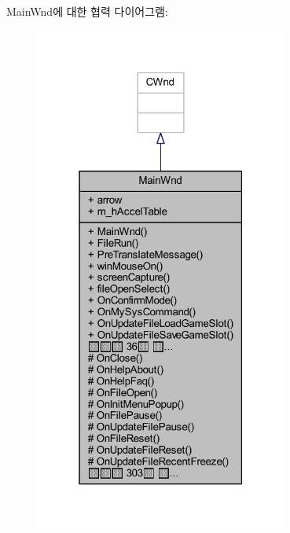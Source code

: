 Main\+Wnd에 대한 협력 다이어그램\+:\nopagebreak
\begin{figure}[H]
\begin{center}
\leavevmode
\includegraphics[width=235pt]{class_main_wnd__coll__graph}
\end{center}
\end{figure}
